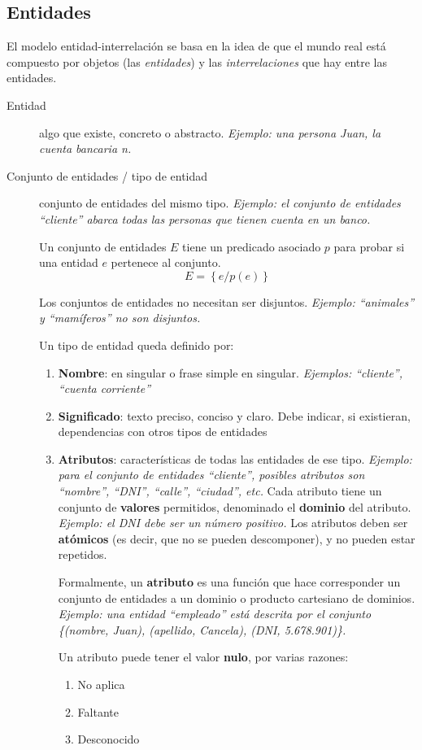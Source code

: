 \documentclass[a4paper, twoside]{article}
\begin{document}
\subsection{Entidades}
El modelo entidad-interrelación se basa en la idea de que el mundo real está compuesto por objetos (las \emph{entidades}) y las \emph{interrelaciones} que hay entre las entidades.

\begin{description}
	\item[Entidad] algo que existe, concreto o abstracto. \emph{Ejemplo: una persona Juan, la cuenta bancaria n.}
	\item[Conjunto de entidades / tipo de entidad] conjunto de entidades del mismo tipo. \emph{Ejemplo: el conjunto de entidades ``cliente'' abarca todas las personas que tienen cuenta en un banco.}

	Un conjunto de entidades $E$ tiene un predicado asociado $p$ para probar si una entidad $e$ pertenece al conjunto.
	\[
		E = \left\{ e/p(e)\right\} 
	\]

	Los conjuntos de entidades no necesitan ser disjuntos. \emph{Ejemplo: ``animales'' y ``mamíferos'' no son disjuntos.}

	Un tipo de entidad queda definido por:
	\begin{enumerate}
		\item \textbf{Nombre}: en singular o frase simple en singular. \emph{Ejemplos: ``cliente'', ``cuenta corriente''}
		\item \textbf{Significado}: texto preciso, conciso y claro. Debe indicar, si existieran, dependencias con otros tipos de entidades
		\item \textbf{Atributos}: características de todas las entidades de ese tipo. \emph{Ejemplo: para el conjunto de entidades ``cliente'', posibles atributos son ``nombre'', ``DNI'', ``calle'', ``ciudad'', etc.} Cada atributo tiene un conjunto de \textbf{valores} permitidos, denominado el \textbf{dominio }del atributo. \emph{Ejemplo: el DNI debe ser un número positivo.} Los atributos deben ser \textbf{atómicos} (es decir, que no se pueden descomponer), y no pueden estar repetidos.

		Formalmente, un \textbf{atributo} es una función que hace corresponder un conjunto de entidades a un dominio o producto cartesiano de dominios. \emph{Ejemplo: una entidad ``empleado'' está descrita por el conjunto
\{(nombre, Juan), (apellido, Cancela), (DNI, 5.678.901)\}.}

		Un atributo puede tener el valor \textbf{nulo}, por varias razones:
		\begin{enumerate}
			\item No aplica
			\item Faltante
			\item Desconocido
		\end{enumerate}


\end{enumerate}
\end{description}
\end{document}
